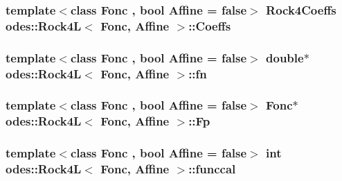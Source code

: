 \hypertarget{classodes_1_1Rock4L_a5140ec19c161d41bf38f203a2684148f}{
\subsubsection[{Coeffs}]{\setlength{\rightskip}{0pt plus 5cm}template$<$class Fonc , bool Affine = false$>$ {\bf Rock4\-Coeffs} {\bf odes\-::\-Rock4\-L}$<$ Fonc, Affine $>$\-::Coeffs\hspace{0.3cm}{\ttfamily [private]}}}\label{classodes_1_1Rock4L_a5140ec19c161d41bf38f203a2684148f}
\hypertarget{classodes_1_1Rock4L_a3f71f2c280eff3e4433c7ce6e62fa9ef}{
\subsubsection[{fn}]{\setlength{\rightskip}{0pt plus 5cm}template$<$class Fonc , bool Affine = false$>$ double$\ast$ {\bf odes\-::\-Rock4\-L}$<$ Fonc, Affine $>$\-::fn\hspace{0.3cm}{\ttfamily [private]}}}\label{classodes_1_1Rock4L_a3f71f2c280eff3e4433c7ce6e62fa9ef}
\hypertarget{classodes_1_1Rock4L_a08b68188749f874241a8ec9026a3cb4e}{
\subsubsection[{Fp}]{\setlength{\rightskip}{0pt plus 5cm}template$<$class Fonc , bool Affine = false$>$ Fonc$\ast$ {\bf odes\-::\-Rock4\-L}$<$ Fonc, Affine $>$\-::Fp\hspace{0.3cm}{\ttfamily [private]}}}\label{classodes_1_1Rock4L_a08b68188749f874241a8ec9026a3cb4e}
\hypertarget{classodes_1_1Rock4L_ad9710df5faa666ea714544750c242f41}{
\subsubsection[{funccal}]{\setlength{\rightskip}{0pt plus 5cm}template$<$class Fonc , bool Affine = false$>$ int {\bf odes\-::\-Rock4\-L}$<$ Fonc, Affine $>$\-::funccal\hspace{0.3cm}{\ttfamily [private]}}}\label{classodes_1_1Rock4L_ad9710df5faa666ea714544750c242f41}
